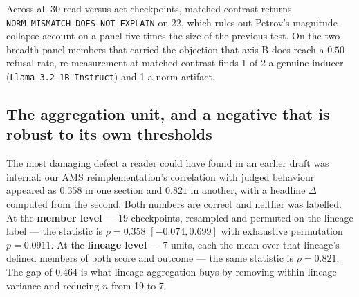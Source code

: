 \documentclass[11pt,letterpaper]{article}
\begin{document}
\begin{table}[!htbp]
\centering
\small
{}
\caption{Refusal rates on fluency-screened text at matched axis-contrast units, three scoring criteria side by side, pooled over the six depth-panel checkpoints. The random control's four-class rate of $0.374$ against its five-class degenerate rate of $0.590$ is the false-positive floor any semantic steering claim has to clear. Criterion agreement is poor where it matters: Cohen's $\kappa$ between the regex and the five-class rubric is $0.424$ on A, $0.108$ on B and $0.020$ on D.}
\label{tab:degeneracy}
\end{table}

Across all 30 read-versus-act checkpoints, matched contrast returns \texttt{NORM\_\allowbreak MISMATCH\_\allowbreak DOES\_\allowbreak NOT\_\allowbreak EXPLAIN} on 22, which rules out Petrov's magnitude-collapse account \citep{Petrov2026} on a panel five times the size of the previous test. On the two breadth-panel members that carried the objection that axis B does reach a $0.50$ refusal rate, re-measurement at matched contrast finds 1 of 2 a genuine inducer (\texttt{Llama-3.2-1B-Instruct}) and 1 a norm artifact.

\subsection{The aggregation unit, and a negative that is robust to its own thresholds}
\label{sec:unit}

The most damaging defect a reader could have found in an earlier draft was internal: our AMS reimplementation's correlation with judged behaviour appeared as $0.358$ in one section and $0.821$ in another, with a headline $\Delta$ computed from the second. Both numbers are correct and neither was labelled. At the \textbf{member level} --- 19 checkpoints, resampled and permuted on the lineage label --- the statistic is $\rho = 0.358$ $[-0.074, 0.699]$ with exhaustive permutation $p = 0.0911$. At the \textbf{lineage level} --- 7 units, each the mean over that lineage's defined members of both score and outcome --- the same statistic is $\rho = 0.821$. The gap of $0.464$ is what lineage aggregation buys by removing within-lineage variance and reducing $n$ from 19 to 7.
\end{document}
